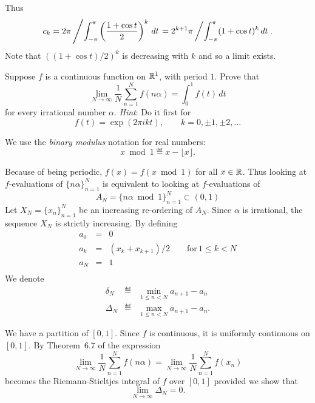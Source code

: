 \begin{enumerate}
Thus
\begin{equation*}
c_k
= 2\pi \left/ \int_{-\pi}^\pi \left(\frac{1+\cos t}{2}\right)^k \,dt \right.
= 2^{k+1}\pi \left/ \int_{-\pi}^\pi (1+\cos t)^k \,dt \right..
\end{equation*}
Note that \(((1+\cos t)/2)^k\) is decreasing with $k$ and so a limit exists.

\begin{excopy}
Suppose $f$ is a continuous function on \(\mathbb{R}^1\), with period $1$. Prove that
\begin{equation*}
 \lim_{N\to\infty} \frac{1}{N} \sum_{n=1}^N f(n\alpha) = \int_0^1 f(t)\,dt
\end{equation*}
for every irrational number \(\alpha\). \emph{Hint}: Do it first for
\begin{equation*}
 f(t) = \exp(2\pi ikt), \qquad k=0,\pm 1,\pm 2,\ldots
\end{equation*}
\end{excopy}

We use the \emph{binary modulus} notation for real numbers:
\begin{equation} \label{eq:4.13.bmod}
x \bmod 1 \eqdef x - \lfloor x\rfloor.
\end{equation}

Because of being periodic,
\(f(x) = f(x \bmod 1)\) for all \(x\in\mathbb{R}\).
Thus looking at $f$-evaluations of
\(\{n\alpha\}_{n=1}^N\) is equivalent
to looking at $f$-evaluations of
\begin{equation*}
A_N = \{n \alpha \bmod 1\}_{n=1}^N \subset (0,1)
\end{equation*}
Let \(X_N = \{x_n\}_{n=1}^N\) be an increasing re-ordering of \(A_N\).
Since \(\alpha\) is irrational, the sequence \(X_N\)
is strictly increasing. By defining
\begin{eqnarray*}
a_0 &=& 0 \\
a_k &=& (x_{k} + x_{k+1}) / 2 \qquad \textrm{for}\, 1\leq k < N \\
a_N &=& 1 \\
\end{eqnarray*}
We denote
\begin{eqnarray*}
\delta_N &\eqdef& \min_{1\leq n < N} a_{n+1} - a_{n} \\
\Delta_N &\eqdef& \max_{1\leq n < N} a_{n+1} - a_{n}.
\end{eqnarray*}

We have a partition of \([0,1]\).
Since $f$ is continuous, it is uniformly continuous on \([0,1]\).
By Theorem~6.7 of \cite{RudinPMA85}
the expression
\begin{equation*}
\lim_{N\to\infty} \frac{1}{N} \sum_{n=1}^N f(n\alpha)
= \lim_{N\to\infty} \frac{1}{N} \sum_{n=1}^N f(x_n)
\end{equation*}
becomes the Riemann-Stieltjes integral of $f$ over \([0,1]\)
provided we show that
\begin{equation} \label{eq:ex4.13:Delto:to0}
\lim_{N\to\infty} \Delta_N = 0.
\end{equation}



\end{enumerate}
